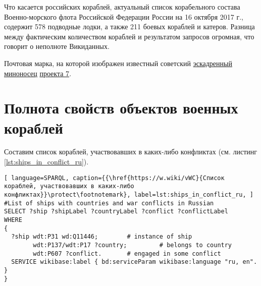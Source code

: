Что касается российских кораблей, актуальный список корабельного состава Военно-морского флота Российской Федерации России на 16 октября 2017 г., содержит \num{578} подводные лодки, а также 211 боевых кораблей и катеров\cite{RussianShips}. Разница между фактическим количеством кораблей и результатом запросов огромная, что говорит о неполноте Викиданных.

\begin{marginfigure}[0.0cm]
  {
    \setlength{\fboxsep}{0pt}%
    \setlength{\fboxrule}{1pt}%
  }
  \caption[Известный советский миноносец.]{Почтовая марка, на которой изображен известный советский \href{https://ru.wikipedia.org/wiki/Эскадренный_миноносец}{эскадренный миноносец} \href{https://ru.wikipedia.org/wiki/Эскадренные_миноносцы_проекта_7}{проекта 7}.}%
  \label{fig:grem_question}%
\end{marginfigure}

\label{question:ship_2}


\section{Полнота свойств объектов военных кораблей}

Составим список кораблей, участвовавших в каких-либо конфликтах (см. листинг \ref{lst:ships_in_conflict_ru}).

\begin{lstlisting}[ language=SPARQL, caption={{\href{https://w.wiki/vWC}{Список кораблей, участвовавших в каких-либо конфликтах}}\protect\footnotemark}, label=lst:ships_in_conflict_ru, ]
#List of ships with countries and war conflicts in Russian
SELECT ?ship ?shipLabel ?countryLabel ?conflict ?conflictLabel
WHERE
{
  ?ship wdt:P31 wd:Q11446;        # instance of ship
        wdt:P137/wdt:P17 ?country;         # belongs to country
        wdt:P607 ?conflict.       # engaged in some conflict
  SERVICE wikibase:label { bd:serviceParam wikibase:language "ru, en". }
}
\end{lstlisting}

